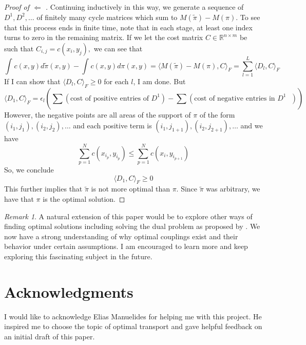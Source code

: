 \documentclass[11pt]{amsart}
\theoremstyle{definition}                  %
\theoremstyle{remark}                      %
\newtheorem{remark}[theorem]{Remark}
\begin{document}
\begin{proof}[Proof of $\Leftarrow$ ]
    Continuing inductively in this way, we generate a sequence of $D^{1},D^{2},\dots$ of finitely many cycle matrices which sum to $M(\tilde \pi) - M(\pi)$. To see that this process ends in finite time, note that in each stage, at least one index turns to zero in the remaining matrix.
    If we let the cost matrix $C \in \mathbb{R}^{n\times m}$ be such that $C_{i,j} = c(x_i,y_j),$ we can see that 
    \[
    \int_{}^{}c(x,y) d \tilde \pi(x,y) - \int_{}^{}c(x,y) d \pi(x,y) = \langle M(\tilde \pi) - M(\pi), C \rangle_F = \sum_{l=1}^{L} \langle D_l, C \rangle_F
    \] 
    If I can show that $\langle D_l, C \rangle_F \ge 0$ for each $l$, I am done. But
    \[
        \langle D_1, C \rangle_F = \epsilon_l\left( \sum_{}^{} (\text{cost of positive entries of $D^1$}) - \sum_{}^{}(\text{cost of negative entries in $D^{1}$ })\right)
    \] 
    However, the negative points are all areas of the support of $\pi$ of the form $(i_1,j_{1}),(i_2,j_{2}),\dots$ and each positive term is $(i_1,j_{1+1}),(i_2,j_{2+1}),\dots$ and we have
    \[
        \sum_{p=1}^{N}c(x_{i_p},y_{i_p}) \le \sum_{p=1}^{N}c(x_i,y_{i_{p+1}})
    \] 
    So, we conclude
    \[
    \langle D_1, C \rangle_F \ge 0
    \] 
    This further implies that $\tilde \pi$ is not more optimal than $\pi$. Since $\tilde \pi$ was arbitrary, we have that $\pi$ is the optimal solution.
\end{proof}

\begin{remark}
A natural extension of this paper would be to explore other ways of finding optimal solutions including solving the dual problem as proposed by  \citet{kantorovich1942english}.
We now have a strong understanding of why optimal couplings exist and their behavior under certain assumptions. I am encouraged to learn more and keep exploring this fascinating subject in the future.
\end{remark}


\section*{Acknowledgments}
I would like to acknowledge Elias Manuelides for helping me with this project. He inspired me to choose the topic of optimal transport and gave helpful feedback on
an initial draft of this paper.



\end{document}
